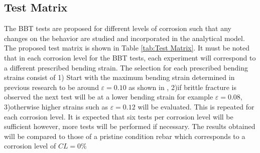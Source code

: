 \newpage
\subsection{Test Matrix}
The BBT tests are proposed for different levels of corrosion such that any changes on the behavior are studied and incorporated in the analytical model. The proposed test matrix is shown in Table \ref{tab:Test Matrix}. It must be noted that in each corrosion level for the BBT tests, each experiment will correspond to a different prescribed bending strain. The selection for each prescribed bending strains consist of 1) Start with the maximum bending strain determined in previous research to be around $\varepsilon=0.10$ as shown in , 2)if brittle fracture is observed the next test will be at a lower bending strain for example $\varepsilon=0.08$, 3)otherwise higher strains such as $\varepsilon=0.12$ will be evaluated. This is repeated for each corrosion level. It is expected that six tests per corrosion level will be sufficient however, more tests will be performed if necessary. The results obtained will be compared to those of a pristine condition rebar which corresponds to a corrosion level of $CL=0\%$

